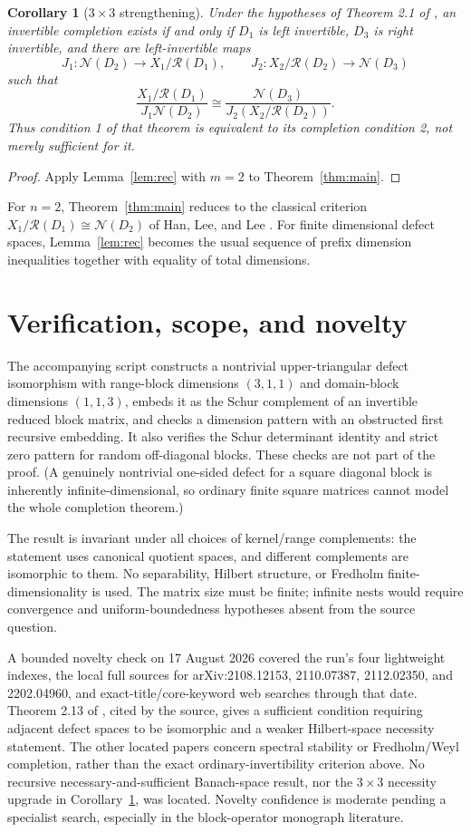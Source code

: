\documentclass[11pt]{article}
\newtheorem{corollary}[theorem]{Corollary}
\newcommand{\N}{\mathcal N}
\newcommand{\R}{\mathcal R}
\begin{document}
\begin{corollary}[$3\times3$ strengthening]\label{cor:three}
Under the hypotheses of Theorem 2.1 of \cite{SD}, an invertible completion
exists if and only if $D_1$ is left invertible, $D_3$ is right invertible,
and there are left-invertible maps
\[
 J_1:\N(D_2)\to X_1/\R(D_1),\qquad
 J_2:X_2/\R(D_2)\to\N(D_3)
\]
such that
\[
 \frac{X_1/\R(D_1)}{J_1\N(D_2)}
 \cong
 \frac{\N(D_3)}{J_2(X_2/\R(D_2))}.
\]
Thus condition 1 of that theorem is equivalent to its completion condition
2, not merely sufficient for it.
\end{corollary}

\begin{proof}
Apply Lemma~\ref{lem:rec} with $m=2$ to Theorem~\ref{thm:main}.
\end{proof}

For $n=2$, Theorem~\ref{thm:main} reduces to the classical criterion
$X_1/\R(D_1)\cong\N(D_2)$ of Han, Lee, and Lee \cite{HLL}.  For finite
dimensional defect spaces, Lemma~\ref{lem:rec} becomes the usual sequence of
prefix dimension inequalities together with equality of total dimensions.

\section{Verification, scope, and novelty}

The accompanying script constructs a nontrivial upper-triangular defect
isomorphism with range-block dimensions $(3,1,1)$ and domain-block dimensions
$(1,1,3)$, embeds it as the Schur complement of an invertible reduced block
matrix, and checks a dimension pattern with an obstructed first recursive
embedding.  It also verifies the Schur determinant identity and strict zero
pattern for random off-diagonal blocks.  These checks are not part of the
proof.  (A genuinely nontrivial one-sided defect for a square diagonal block
is inherently infinite-dimensional, so ordinary finite square matrices cannot
model the whole completion theorem.)

The result is invariant under all choices of kernel/range complements: the
statement uses canonical quotient spaces, and different complements are
isomorphic to them.  No separability, Hilbert structure, or Fredholm
finite-dimensionality is used.  The matrix size must be finite; infinite
nests would require convergence and uniform-boundedness hypotheses absent
from the source question.

A bounded novelty check on 17 August 2026 covered the run's four lightweight
indexes, the local full sources for arXiv:2108.12153, 2110.07387, 2112.02350,
and 2202.04960, and exact-title/core-keyword web searches through that date.
Theorem 2.13 of \cite{S21}, cited by the source, gives a sufficient condition
requiring adjacent defect spaces to be isomorphic and a weaker Hilbert-space
necessity statement.  The other located papers concern spectral stability or
Fredholm/Weyl completion, rather than the exact ordinary-invertibility
criterion above.  No recursive necessary-and-sufficient Banach-space result,
nor the $3\times3$ necessity upgrade in Corollary~\ref{cor:three}, was
located.  Novelty confidence is moderate pending a specialist search,
especially in the block-operator monograph literature.
\end{document}
